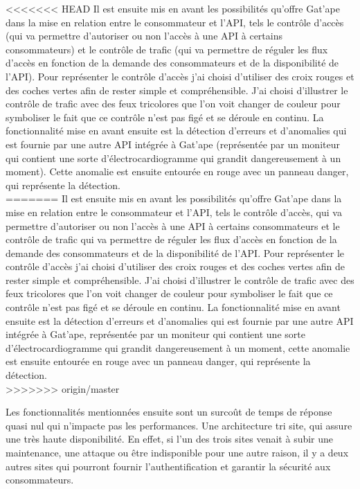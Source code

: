 <<<<<<< HEAD
Il est ensuite mis en avant les possibilités qu'offre Gat'ape dans la mise en relation entre le consommateur et l'API, tels le contrôle d'accès (qui va permettre d'autoriser ou non l'accès à une API à certains consommateurs) et le contrôle de trafic (qui va permettre de réguler les flux d'accès en fonction de la demande des consommateurs et de la disponibilité de l'API). Pour représenter le contrôle d'accès j'ai choisi d'utiliser des croix rouges et des coches vertes afin de rester simple et compréhensible. J'ai choisi d'illustrer le contrôle de trafic avec des feux tricolores que l'on voit changer de couleur pour symboliser le fait que ce contrôle n'est pas figé et se déroule en continu. La fonctionnalité mise en avant ensuite est la détection d'erreurs et d'anomalies qui est fournie par une autre API intégrée à Gat'ape (représentée par un moniteur qui contient une sorte d'électrocardiogramme qui grandit dangereusement à un moment). Cette anomalie est ensuite entourée en rouge avec un panneau danger, qui représente la détection.\\
=======
Il est ensuite mis en avant les possibilités qu'offre Gat'ape dans la mise en relation entre le consommateur et l'API, tels le contrôle d'accès, qui va permettre d'autoriser ou non l'accès à une API à certains consommateurs et le contrôle de trafic qui va permettre de réguler les flux d'accès en fonction de la demande des consommateurs et de la disponibilité de l'API. Pour représenter le contrôle d'accès j'ai choisi d'utiliser des croix rouges et des coches vertes afin de rester simple et compréhensible. J'ai choisi d'illustrer le contrôle de trafic avec des feux tricolores que l'on voit changer de couleur pour symboliser le fait que ce contrôle n'est pas figé et se déroule en continu. La fonctionnalité mise en avant ensuite est la détection d'erreurs et d'anomalies qui est fournie par une autre API intégrée à Gat'ape, représentée par un moniteur qui contient une sorte d'électrocardiogramme qui grandit dangereusement à un moment, cette anomalie est ensuite entourée en rouge avec un panneau danger, qui représente la détection.\\
>>>>>>> origin/master

Les fonctionnalités mentionnées ensuite sont un surcoût de temps de réponse quasi nul qui n'impacte pas les performances. Une architecture tri site, qui assure  une très haute disponibilité. En effet, si l'un des trois sites venait à subir une maintenance, une attaque ou être indisponible pour une autre raison, il y a deux autres sites qui pourront fournir l'authentification et garantir la sécurité aux consommateurs.\\

